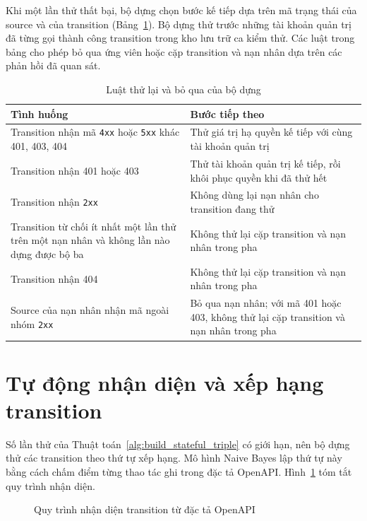 Khi một lần thử thất bại, bộ dựng chọn bước kế tiếp dựa trên mã trạng thái của source và của transition (Bảng~\ref{tab:retry_rules}). Bộ dựng thử trước những tài khoản quản trị đã từng gọi thành công transition trong kho lưu trữ ca kiểm thử. Các luật trong bảng cho phép bỏ qua ứng viên hoặc cặp transition và nạn nhân dựa trên các phản hồi đã quan sát.

\begin{table}[htbp]
  \centering
  \caption{Luật thử lại và bỏ qua của bộ dựng}
  \label{tab:retry_rules}
  \begin{tabularx}{\textwidth}{@{}>{\raggedright\arraybackslash}X >{\raggedright\arraybackslash}X@{}}
    \toprule
    Tình huống & Bước tiếp theo \\
    \midrule
    Transition nhận mã \texttt{4xx} hoặc \texttt{5xx} khác 401, 403, 404 & Thử giá trị hạ quyền kế tiếp với cùng tài khoản quản trị \\
    Transition nhận 401 hoặc 403 & Thử tài khoản quản trị kế tiếp, rồi khôi phục quyền khi đã thử hết \\
    Transition nhận \texttt{2xx} & Không dùng lại nạn nhân cho transition đang thử \\
    Transition từ chối ít nhất một lần thử trên một nạn nhân và không lần nào dựng được bộ ba & Không thử lại cặp transition và nạn nhân trong pha \\
    Transition nhận 404 & Không thử lại cặp transition và nạn nhân trong pha \\
    Source của nạn nhân nhận mã ngoài nhóm \texttt{2xx} & Bỏ qua nạn nhân; với mã 401 hoặc 403, không thử lại cặp transition và nạn nhân trong pha \\
    \bottomrule
  \end{tabularx}
\end{table}

\section{Tự động nhận diện và xếp hạng transition}
\label{sec:method_ranking}

Số lần thử của Thuật toán~\ref{alg:build_stateful_triple} có giới hạn, nên bộ dựng thử các transition theo thứ tự xếp hạng. Mô hình Naive Bayes lập thứ tự này bằng cách chấm điểm từng thao tác ghi trong đặc tả OpenAPI. Hình~\ref{fig:transition_inference} tóm tắt quy trình nhận diện.

\begin{figure}[htbp]
  \centering
  
  \caption{Quy trình nhận diện transition từ đặc tả OpenAPI}
  \label{fig:transition_inference}
\end{figure}

